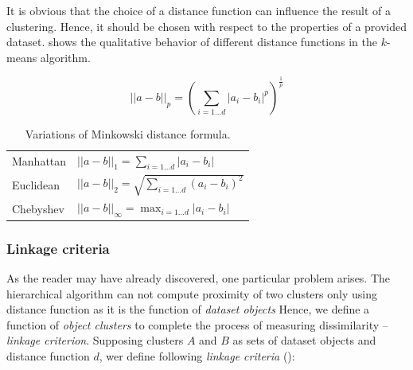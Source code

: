 It is obvious that the choice of a distance function can influence the result of a clustering. Hence, it should be chosen with respect to the properties of a provided dataset. \cite{aggarwal2001surprising} shows the qualitative behavior of different distance functions in the $k$-means algorithm.  

\begin{equation}\label{eq01:mink}
||a-b||_p = (\sum_{i=1...d}|a_i-b_i|^p)^{\frac{1}{p}}
\end{equation}

\begin{table}
	\centering
	\begin{tabular}{ll}
		\toprule
		Manhattan & $||a-b||_1 = \sum_{i=1...d}|a_i-b_i|$          \\
		Euclidean & $||a-b||_2 = \sqrt{\sum_{i=1...d}(a_i-b_i)^2}$ \\
		Chebyshev & $||a-b||_\infty = \max_{i=1\dots d}|a_i-b_i|$  \\ \bottomrule
	\end{tabular}
	\caption{Variations of Minkowski distance formula.}
	\label{tab01:mink}
\end{table}

\subsubsection{Linkage criteria}

As the reader may have already discovered, one particular problem arises. The hierarchical algorithm can not compute proximity of two clusters only using distance function as it is the function of \emph{dataset objects} Hence, we define a function of \emph{object clusters} to complete the process of measuring dissimilarity -- \emph{linkage criterion}. Supposing clusters $A$ and $B$ as sets of dataset objects and distance function $d$, wer define following \emph{linkage criteria} (\cite{yim2015hierarchical}):

